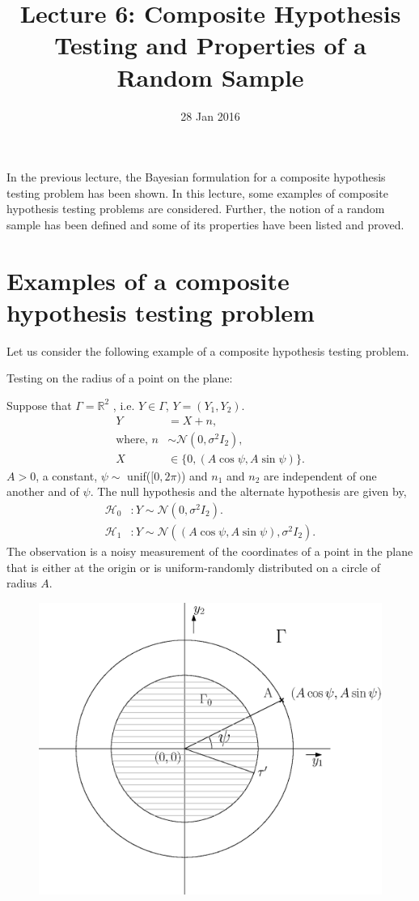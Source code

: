 \documentclass[a4paper,english,12pt]{article}
\title{Lecture 6: Composite Hypothesis Testing and Properties of a Random Sample}
\date{28 Jan 2016}
\author{}
\begin{document}
\maketitle
In the previous lecture, the Bayesian formulation for a composite hypothesis testing problem has been shown. In this lecture, some examples of composite hypothesis testing problems are considered. Further, the notion of a random sample has been defined and some of its properties have been listed and proved.
\section{Examples of a composite hypothesis testing problem}
Let us consider the following example of a composite hypothesis testing problem.
\begin{exmp}
Testing on the radius of a point on the plane:
\par Suppose that $\Gamma = {\mathbb{R}}^2$ , i.e. $Y \in \Gamma$, $Y = (Y_1,Y_2).$
\begin{align*}
Y &= X + n,\\
\mbox{where, }
n &\sim \mathcal{N}(0,\sigma^2I_2),\nonumber\\
X &\in \{0,(A\cos\psi,A\sin\psi)\}.\nonumber
\end{align*}
$A > 0$, a constant, $\psi \sim$ unif($[0,2\pi)$) and $n_1$ and $n_2$ are independent of one another and of $\psi$. The null hypothesis and the alternate hypothesis are given by,
\begin{align*}
\mathcal{H}_0 &: Y \sim \mathcal{N}(0,\sigma^2I_2).\\
\mathcal{H}_1 &: Y \sim \mathcal{N}((A\cos\psi,A\sin\psi),\sigma^2I_2).
\end{align*}	
The observation is a noisy measurement of the coordinates of a point in the plane that is either at the origin or is uniform-randomly distributed on a circle of radius $A$.
\begin{figure}
\centering
\includegraphics[scale=0.4]{Figures/decisionRegions.eps}

\end{figure}
\end{exmp}
\end{document}
